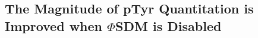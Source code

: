 \documentclass[journal=jprobs,manuscript=article]{achemso}
\begin{document}


\subsection{The Magnitude of pTyr Quantitation is Improved when $\Phi$SDM is Disabled}
\end{document}
